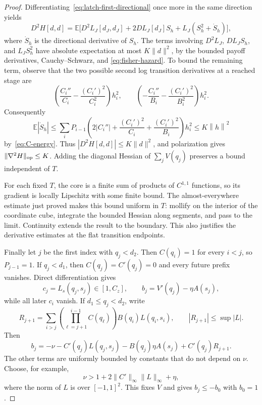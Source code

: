 \documentclass[11pt]{article}
\newcommand{\E}{\mathbb E}
\newcommand{\norm}[1]{\left\lVert #1\right\rVert}
\theoremstyle{definition}
\theoremstyle{remark}
\begin{document}
\begin{proof}
Differentiating~\eqref{eq:latch-first-directional} once more in the same
direction yields
\begin{equation}\label{eq:latch-second-directional}
 D^2H[d,d]
 =\E\bigl[
 D^2L_J[d_J,d_J]+2DL_J[d_J]S_h
 +L_J(S_h^2+\dot S_h)
 \bigr],
\end{equation}
where $\dot S_h$ is the directional derivative of $S_h$. The terms involving
$D^2L_J$, $DL_J S_h$, and $L_JS_h^2$ have absolute expectation at most
$K\|d\|^2$, by the bounded payoff derivatives, Cauchy--Schwarz, and
\eqref{eq:fisher-hazard}. To bound the remaining term, observe that the two
possible second log transition derivatives at a reached stage are
\[
 \left(\frac{C_i''}{C_i}-\frac{(C_i')^2}{C_i^2}\right)h_i^2,
 \qquad
 \left(-\frac{C_i''}{B_i}-\frac{(C_i')^2}{B_i^2}\right)h_i^2.
\]
Consequently
\[
 \E|\dot S_h|
 \le\sum_iP_{i-1}
 \left(2|C_i''|+\frac{(C_i')^2}{C_i}
                    +\frac{(C_i')^2}{B_i}\right)h_i^2
 \le K\norm{h}^2
\]
by~\eqref{eq:C-energy}. Thus
$|D^2H[d,d]|\le K\|d\|^2$, and polarization gives
$\|\nabla^2H\|_{\rm op}\le K$. Adding the diagonal Hessian of
$\sum_jV(q_j)$ preserves a bound independent of $T$.

For each fixed $T$, the core is a finite sum of products of $C^{1,1}$
functions, so its gradient is locally Lipschitz with some finite bound.
The almost-everywhere estimate just proved makes this bound uniform in $T$:
mollify on the interior of the coordinate cube, integrate the bounded
Hessian along segments, and pass to the limit. Continuity extends the
result to the boundary. This also justifies the derivative estimates at
the flat transition endpoints.

Finally let $j$ be the first index with $q_j<d_2$.  Then $C(q_i)=1$ for every
$i<j$, so $P_{j-1}=1$.  If $q_j<d_1$, then $C(q_j)=C'(q_j)=0$ and every future
prefix vanishes.  Direct differentiation gives
\[
 c_j=L_s(q_j,s_j)\in[1,C_z],
 \qquad
 b_j=V'(q_j)-\eta A(s_j),
\]
while all later $c_i$ vanish.  If $d_1\le q_j<d_2$, write
\[
 R_{j+1}=\sum_{i>j}
 \left(\prod_{\ell=j+1}^{i-1}C(q_\ell)\right)
 B(q_i)L(q_i,s_i),
 \qquad |R_{j+1}|\le\sup|L|.
\]
Then
\[
 b_j=-\nu-C'(q_j)L(q_j,s_j)
     -B(q_j)\eta A(s_j)+C'(q_j)R_{j+1}.
\]
The other terms are uniformly bounded by constants that do not depend on
$\nu$. Choose, for example,
\[
 \nu>1+2\|C'\|_\infty\|L\|_\infty+\eta,
\]
where the norm of $L$ is over $[-1,1]^2$. This fixes $V$ and gives
$b_j\le-b_0$ with $b_0=1$.
\end{proof}
\end{document}
